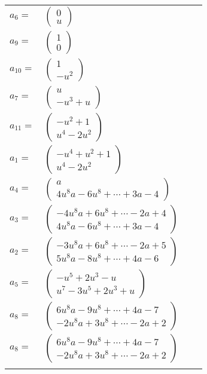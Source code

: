 \documentclass[1p]{elsarticle_modified}
\theoremstyle{definition}
\begin{document}
\begin{tabular}{m{7pt} m{180pt} m{7pt} m{180pt} }
\flushright $a_{6}=$&$\begin{pmatrix}0\\u\end{pmatrix}$ \\
\flushright $a_{9}=$&$\begin{pmatrix}1\\0\end{pmatrix}$ \\
\flushright $a_{10}=$&$\begin{pmatrix}1\\- u^2\end{pmatrix}$ \\
\flushright $a_{7}=$&$\begin{pmatrix}u\\- u^3+u\end{pmatrix}$ \\
\flushright $a_{11}=$&$\begin{pmatrix}- u^2+1\\u^4-2 u^2\end{pmatrix}$ \\
\flushright $a_{1}=$&$\begin{pmatrix}- u^4+u^2+1\\u^4-2 u^2\end{pmatrix}$ \\
\flushright $a_{4}=$&$\begin{pmatrix}a\\4 u^8 a-6 u^8+\cdots+3 a-4\end{pmatrix}$ \\
\flushright $a_{3}=$&$\begin{pmatrix}-4 u^8 a+6 u^8+\cdots-2 a+4\\4 u^8 a-6 u^8+\cdots+3 a-4\end{pmatrix}$ \\
\flushright $a_{2}=$&$\begin{pmatrix}-3 u^8 a+6 u^8+\cdots-2 a+5\\5 u^8 a-8 u^8+\cdots+4 a-6\end{pmatrix}$ \\
\flushright $a_{5}=$&$\begin{pmatrix}- u^5+2 u^3- u\\u^7-3 u^5+2 u^3+u\end{pmatrix}$ \\
\flushright $a_{8}=$&$\begin{pmatrix}6 u^8 a-9 u^8+\cdots+4 a-7\\-2 u^8 a+3 u^8+\cdots-2 a+2\end{pmatrix}$\\ \flushright $a_{8}=$&$\begin{pmatrix}6 u^8 a-9 u^8+\cdots+4 a-7\\-2 u^8 a+3 u^8+\cdots-2 a+2\end{pmatrix}$\\&\end{tabular}
\end{document}
